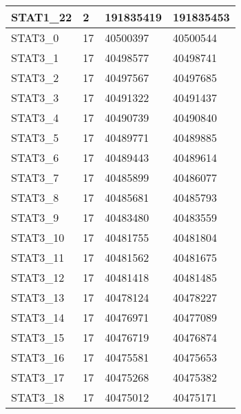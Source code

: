 \begin{longtable}{| p{} | C{.10\textwidth} | C{.35\textwidth} | C{.35\textwidth} |}
STAT1\_22               & 2            & 191835419             & 191835453           \\ \hline
STAT3\_0                & 17           & 40500397              & 40500544            \\ \hline
STAT3\_1                & 17           & 40498577              & 40498741            \\ \hline
STAT3\_2                & 17           & 40497567              & 40497685            \\ \hline
STAT3\_3                & 17           & 40491322              & 40491437            \\ \hline
STAT3\_4                & 17           & 40490739              & 40490840            \\ \hline
STAT3\_5                & 17           & 40489771              & 40489885            \\ \hline
STAT3\_6                & 17           & 40489443              & 40489614            \\ \hline
STAT3\_7                & 17           & 40485899              & 40486077            \\ \hline
STAT3\_8                & 17           & 40485681              & 40485793            \\ \hline
STAT3\_9                & 17           & 40483480              & 40483559            \\ \hline
STAT3\_10               & 17           & 40481755              & 40481804            \\ \hline
STAT3\_11               & 17           & 40481562              & 40481675            \\ \hline
STAT3\_12               & 17           & 40481418              & 40481485            \\ \hline
STAT3\_13               & 17           & 40478124              & 40478227            \\ \hline
STAT3\_14               & 17           & 40476971              & 40477089            \\ \hline
STAT3\_15               & 17           & 40476719              & 40476874            \\ \hline
STAT3\_16               & 17           & 40475581              & 40475653            \\ \hline
STAT3\_17               & 17           & 40475268              & 40475382            \\ \hline
STAT3\_18               & 17           & 40475012              & 40475171            \\ \hline

\end{longtable}

